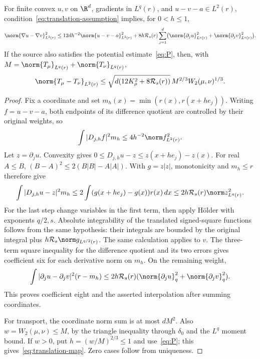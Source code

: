 \begin{proposition}\label{prop:translation}
For finite convex $u,v$ on $\R^d$, gradients in $L^q(r)$, and $u-v-a\in L^2(r)$, condition~\eqref{eq:translation-assumption} implies, for $0<h\le1$,
\[
 \norm{\nabla u-\nabla v}_{L^2(r)}^2
 \le12d h^{-2}\norm{u-v-a}_{L^2(r)}^2
 +8h\mathcal R_s(r)\sum_{j=1}^d
 \bigl(\norm{\partial_j u}_{L^q(r)}^2+
       \norm{\partial_j v}_{L^q(r)}^2\bigr).
\]
If the source also satisfies the potential estimate~\eqref{eq:P}, then, with
$M=\norm{T_\mu}_{L^q(r)}+\norm{T_\nu}_{L^q(r)}$,
\begin{equation}\label{eq:translation-map}
 \norm{T_\mu-T_\nu}_{L^2(r)}
 \le\sqrt{d(12K_\rho^2+8\mathcal R_s(r))}\,
             M^{2/3}W_2(\mu,\nu)^{1/3}.
\end{equation}
\end{proposition}
\begin{proof}
Fix a coordinate and set $m_h(x)=\min(r(x),r(x+he_j))$.
Writing $f=u-v-a$, both endpoints of its difference quotient are controlled by their original weights, so
\[
 \int|D_{j,h}f|^2m_h\le4h^{-2}\norm f_{L^2(r)}^2.
\]
Let $z=\partial_j u$. Convexity gives
$0\le D_{j,h}u-z\le z(x+he_j)-z(x)$.
For real $A\le B$,
$(B-A)^2\le2(B|B|-A|A|)$.
With $g=z|z|$, monotonicity and $m_h\le r$ therefore give
\[
 \int|D_{j,h}u-z|^2m_h
 \le2\int(g(x+he_j)-g(x))r(x)\,dx
 \le2h\mathcal R_s(r)\norm z_{L^q(r)}^2.
\]
For the last step change variables in the first term, then apply H\"older with exponents $q/2,s$. Absolute integrability of the translated signed-square functions follows from the same hypothesis: their integrals are bounded by the original integral plus
$h\mathcal R_s\norm g_{L^{q/2}(r)}$.
The same calculation applies to $v$. The three-term square inequality for the difference quotient and its two errors gives coefficient six for each derivative norm on $m_h$. On the remaining weight,
\[
 \int|\partial_j u-\partial_j v|^2(r-m_h)
 \le2h\mathcal R_s(r)
       (\norm{\partial_j u}_q^2+\norm{\partial_j v}_q^2).
\]
This proves coefficient eight and the asserted interpolation after summing coordinates.

For transport, the coordinate norm sum is at most $dM^2$. Also $w=W_2(\mu,\nu)\le M$, by the triangle inequality through $\delta_0$ and the $L^q$ moment bound. If $w>0$, put $h=(w/M)^{2/3}\le1$ and use~\eqref{eq:P}; this gives~\eqref{eq:translation-map}. Zero cases follow from uniqueness.
\end{proof}

